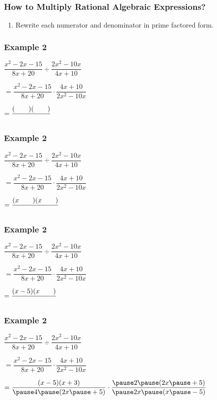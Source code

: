 \documentclass[14pt]{beamer}
\begin{document}
    \begin{frame}
    	\frametitle{How to Multiply Rational Algebraic Expressions?}
    	\begin{enumerate}
    		\item Rewrite each numerator and denominator in prime factored form.
    	\end{enumerate}
    \end{frame}

    \begin{frame}
    	\frametitle{Example 2}
    	$\dfrac{x^2 - 2x - 15}{8x + 20} \div \dfrac{2x^2 - 10x}{4x + 10}$ 
    	
    	\vspace{1em}$ =  \dfrac{x^2 - 2x - 15}{8x + 20} \cdot \dfrac{4x + 10}{2x^2 - 10x}$
    	
    	\pause \vspace{1em}$ =  \dfrac{(\text{\hspace{2em}})(\text{\hspace{2em}})}{\text{\hspace{2em}}} $
    \end{frame}

    \begin{frame}
    	\frametitle{Example 2}
    	$\dfrac{x^2 - 2x - 15}{8x + 20} \div \dfrac{2x^2 - 10x}{4x + 10}$ 
    	
    	\vspace{1em}$ =  \dfrac{x^2 - 2x - 15}{8x + 20} \cdot \dfrac{4x + 10}{2x^2 - 10x}$
    	
    	\vspace{1em}$ =  \dfrac{(x\text{\hspace{2em}})(x\text{\hspace{2em}})}{\text{\hspace{2em}}} $
    \end{frame}

    \begin{frame}
    	\frametitle{Example 2}
    	$\dfrac{x^2 - 2x - 15}{8x + 20} \div \dfrac{2x^2 - 10x}{4x + 10}$ 
    	
    	\vspace{1em}$ =  \dfrac{x^2 - 2x - 15}{8x + 20} \cdot \dfrac{4x + 10}{2x^2 - 10x}$
    	
    	\vspace{1em}$ =  \dfrac{(x-5)(x\text{\hspace{2em}})}{\text{\hspace{2em}}} $
    \end{frame}

    \begin{frame}
    	\frametitle{Example 2}
    	$\dfrac{x^2 - 2x - 15}{8x + 20} \div \dfrac{2x^2 - 10x}{4x + 10}$ 
    	
    	\vspace{1em}$ =  \dfrac{x^2 - 2x - 15}{8x + 20} \cdot \dfrac{4x + 10}{2x^2 - 10x}$
    	
    	\vspace{1em}$ =  \dfrac{(x-5)(x + 3)}{\pause 4 \pause (2x \pause + 5)} \cdot \dfrac{\pause 2 \pause (2x \pause + 5)}{\pause 2x \pause (x \pause -5)}  $
    \end{frame}
\end{document}
